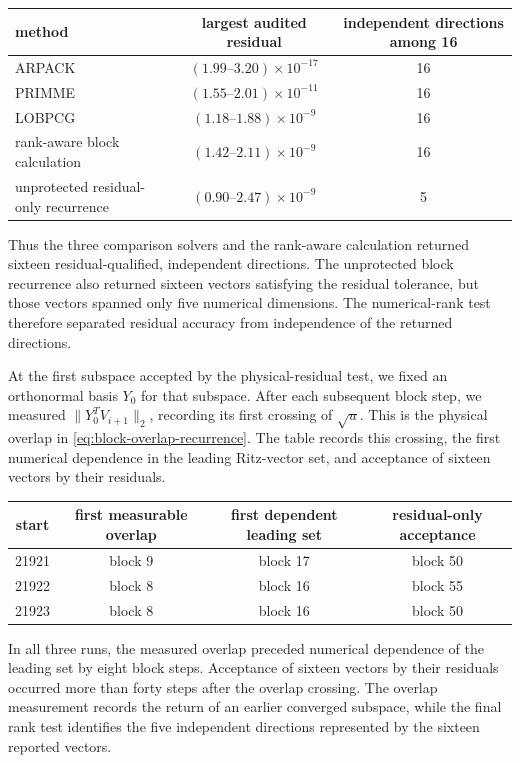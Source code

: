 \documentclass[11pt]{article}
\theoremstyle{definition}
\begin{document}
\begin{center}
\small
\begin{tabular}{lcc}
\toprule
method & largest audited residual & independent directions among 16\\
\midrule
ARPACK & $(1.99\text{--}3.20)\times10^{-17}$ & 16\\
PRIMME & $(1.55\text{--}2.01)\times10^{-11}$ & 16\\
LOBPCG & $(1.18\text{--}1.88)\times10^{-9}$ & 16\\
rank-aware block calculation & $(1.42\text{--}2.11)\times10^{-9}$ & 16\\
unprotected residual-only recurrence & $(0.90\text{--}2.47)\times10^{-9}$ & 5\\
\bottomrule
\end{tabular}
\end{center}

Thus the three comparison solvers and the rank-aware calculation returned
sixteen residual-qualified, independent directions.  The unprotected block
recurrence also returned sixteen vectors satisfying the residual tolerance,
but those vectors spanned only five numerical dimensions.  The numerical-rank
test therefore separated residual accuracy from independence of the returned
directions.

At the first subspace accepted by the physical-residual test, we fixed an
orthonormal basis $Y_0$ for that subspace.  After each subsequent block step, we measured
$\|Y_0^TV_{i+1}\|_2$, recording its first crossing of $\sqrt u$.
This is the physical overlap in \eqref{eq:block-overlap-recurrence}.
The table records this crossing, the first numerical dependence in the
leading Ritz-vector set, and acceptance of sixteen vectors by their residuals.

\begin{center}
\small
\begin{tabular}{cccc}
\toprule
start & first measurable overlap & first dependent leading set
      & residual-only acceptance\\
\midrule
21921 & block 9 & block 17 & block 50\\
21922 & block 8 & block 16 & block 55\\
21923 & block 8 & block 16 & block 50\\
\bottomrule
\end{tabular}
\end{center}

In all three runs, the measured overlap preceded numerical dependence of
the leading set by eight block steps.  Acceptance of sixteen vectors by
their residuals occurred more than forty steps after the overlap crossing.
The overlap measurement records the return of an earlier converged
subspace, while the final rank test identifies the five independent
directions represented by the sixteen reported vectors.
\end{document}

